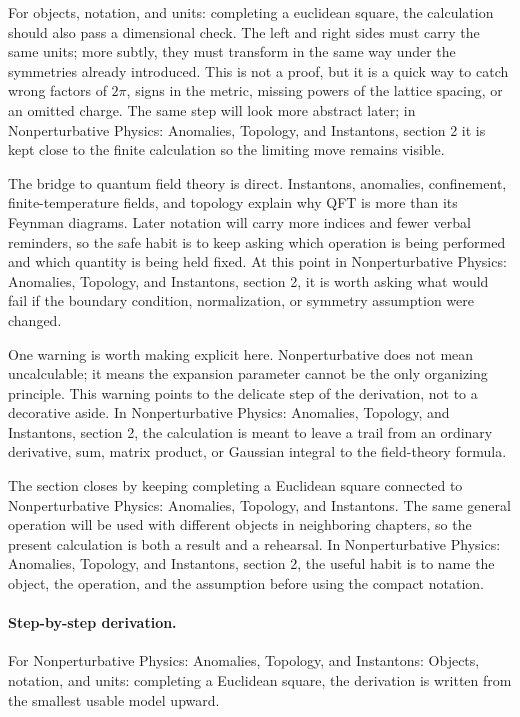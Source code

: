 For objects, notation, and units: completing a euclidean square, the calculation should also pass a dimensional check.  The left and right sides must carry the same units; more subtly, they must transform in the same way under the symmetries already introduced.  This is not a proof, but it is a quick way to catch wrong factors of \(2\pi\), signs in the metric, missing powers of the lattice spacing, or an omitted charge.  The same step will look more abstract later; in Nonperturbative Physics: Anomalies, Topology, and Instantons, section 2 it is kept close to the finite calculation so the limiting move remains visible.

The bridge to quantum field theory is direct.  Instantons, anomalies, confinement, finite-temperature fields, and topology explain why QFT is more than its Feynman diagrams.  Later notation will carry more indices and fewer verbal reminders, so the safe habit is to keep asking which operation is being performed and which quantity is being held fixed.  At this point in Nonperturbative Physics: Anomalies, Topology, and Instantons, section 2, it is worth asking what would fail if the boundary condition, normalization, or symmetry assumption were changed.

One warning is worth making explicit here.  Nonperturbative does not mean uncalculable; it means the expansion parameter cannot be the only organizing principle.  This warning points to the delicate step of the derivation, not to a decorative aside.  In Nonperturbative Physics: Anomalies, Topology, and Instantons, section 2, the calculation is meant to leave a trail from an ordinary derivative, sum, matrix product, or Gaussian integral to the field-theory formula.

The section closes by keeping completing a Euclidean square connected to Nonperturbative Physics: Anomalies, Topology, and Instantons.  The same general operation will be used with different objects in neighboring chapters, so the present calculation is both a result and a rehearsal.  In Nonperturbative Physics: Anomalies, Topology, and Instantons, section 2, the useful habit is to name the object, the operation, and the assumption before using the compact notation.



\paragraph{Step-by-step derivation.}

For Nonperturbative Physics: Anomalies, Topology, and Instantons: Objects, notation, and units: completing a Euclidean square, the derivation is written from the smallest usable model upward.

